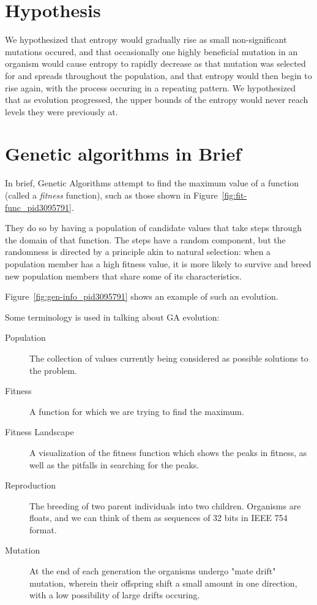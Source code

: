 \documentclass[11pt]{article}
\begin{document}
\section{Hypothesis}

We hypothesized that entropy would gradually rise as small
non-significant mutations occured, and that occasionally one highly
beneficial mutation in an organism would cause entropy to rapidly
decrease as that mutation was selected for and spreads throughout the
population, and that entropy would then begin to rise again, with the process occuring in a
repeating pattern. We hypothesized that as evolution progressed, the upper
bounds of the entropy would never reach levels they were previously
at.


\section{Genetic algorithms in Brief}

In brief, Genetic Algorithms attempt to find the maximum value of a
function (called a \emph{fitness} function), such as those shown in
Figure~\ref{fig:fit-func_pid3095791}.

They do so by having a population of candidate values that take steps
through the domain of that function.  The steps have a random
component, but the randomness is directed by a principle akin to
natural selection: when a population member has a high fitness value,
it is more likely to survive and breed new population members that
share some of its characteristics.

Figure~\ref{fig:gen-info_pid3095791} shows an example of such an
evolution.

Some terminology is used in talking about GA evolution:

\begin{description}
\item[Population] The collection of values currently being considered
  as possible solutions to the problem.
\item[Fitness] A function for which we are trying to find the maximum.
\item[Fitness Landscape] A visualization of the fitness function which
  shows the peaks in fitness, as well as the pitfalls in searching for
  the peaks.
\item[Reproduction] The breeding of two parent individuals into two
  children. Organisms are floats, and we can think of them as
  sequences of 32 bits in IEEE 754 format.
\item[Mutation] At the end of each generation the organisms undergo
  "mate drift" mutation, wherein their offspring shift a small amount
  in one direction, with a low possibility of large drifts occuring.
\end{description}
\end{document}
